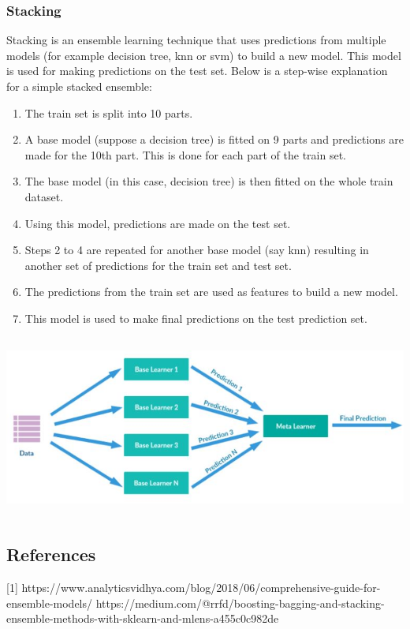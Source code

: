 \subsubsection*{Stacking}
Stacking is an ensemble learning technique that uses predictions from multiple models (for example decision tree, knn or svm) to build a new model. This model is used for making predictions on the test set. Below is a step-wise explanation for a simple stacked ensemble:
\begin{enumerate}
    \item The train set is split into 10 parts.
    \item A base model (suppose a decision tree) is fitted on 9 parts and predictions are made for the 10th part. This is done for each part of the train set.
    \item The base model (in this case, decision tree) is then fitted on the whole train dataset.
    \item Using this model, predictions are made on the test set.
    \item Steps 2 to 4 are repeated for another base model (say knn) resulting in another set of predictions for the train set and test set.

    \item The predictions from the train set are used as features to build a new model.
    \item This model is used to make final predictions on the test prediction set.
\end{enumerate}
\begin{center}
   \includegraphics[height=6cm]{Images/A8_img2.jpg}
\end{center}

\subsection*{References}
   [1] https://www.analyticsvidhya.com/blog/2018/06/comprehensive-guide-for-ensemble-models/  \newline
   [2] https://medium.com/@rrfd/boosting-bagging-and-stacking-ensemble-methods-with-sklearn-and-mlens-a455c0c982de 